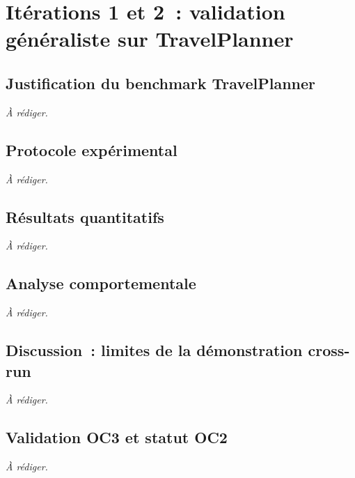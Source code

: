 \chapter{It\'erations 1 et 2~: validation g\'en\'eraliste sur TravelPlanner}\label{chap:travelplanner}


\section{Justification du benchmark TravelPlanner}\label{sec:tp-justif}

\textit{\`A r\'ediger.}

\section{Protocole exp\'erimental}\label{sec:tp-protocole}

\textit{\`A r\'ediger.}

\section{R\'esultats quantitatifs}\label{sec:tp-resultats}

\textit{\`A r\'ediger.}

\section{Analyse comportementale}\label{sec:tp-comportement}

\textit{\`A r\'ediger.}

\section{Discussion~: limites de la d\'emonstration cross-run}\label{sec:tp-limites}

\textit{\`A r\'ediger.}

\section{Validation OC3 et statut OC2}\label{sec:tp-validation}

\textit{\`A r\'ediger.}

